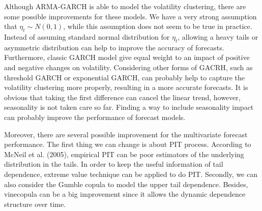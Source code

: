 \documentclass[12pt,a4paper]{article}
\numberwithin{equation}{section}
\begin{document}
Although ARMA-GARCH is able to model the volatility clustering, there are some possible improvements for these models. We have a very strong assumption that $\eta_t \sim N(0,1)$, while this assumption does not seem to be true in practice. Instead of assuming standard normal distribution for $\eta_t$, allowing a heavy tails or asymmetric distribution can help to improve the accuracy of forecasts. Furthermore, classic GARCH model give equal weight to an impact of positive and negative changes on volatility. Considering other forms of GACRH, such as threshold GARCH or exponential GARCH, can probably help to capture the volatility clustering more properly, resulting in a more accurate forecasts. It is obvious that taking the first difference can cancel the linear trend, however, seasonality is not taken care so far. Finding a way to include seasonality impact can probably improve the performance of forecast models.

Moreover, there are several possible improvement for the multivariate forecast performance. The first thing we can change is about PIT process. According to McNeil et al. (2005), empirical PIT can be poor estimators of the underlying distribution in the tails. In order to keep the useful information of tail dependence, extreme value technique can be applied to do PIT. Secondly, we can also consider the Gumble copula to model the upper tail dependence. Besides, vinecopula can be a big improvement since it allows the dynamic dependence structure over time. 
\end{document}
